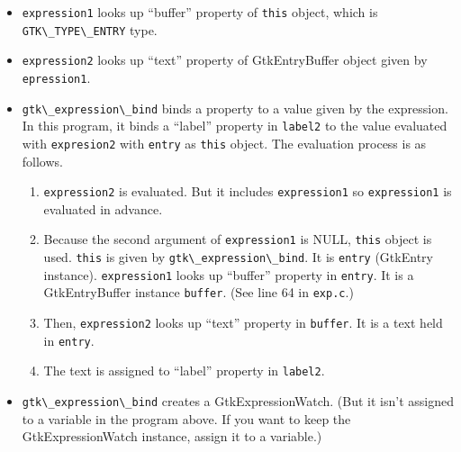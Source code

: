 \begin{itemize}
\tightlist
\item
  \passthrough{\lstinline!expression1!} looks up ``buffer'' property of
  \passthrough{\lstinline!this!} object, which is
  \passthrough{\lstinline!GTK\_TYPE\_ENTRY!} type.
\item
  \passthrough{\lstinline!expression2!} looks up ``text'' property of
  GtkEntryBuffer object given by \passthrough{\lstinline!epression1!}.
\item
  \passthrough{\lstinline!gtk\_expression\_bind!} binds a property to a
  value given by the expression. In this program, it binds a ``label''
  property in \passthrough{\lstinline!label2!} to the value evaluated
  with \passthrough{\lstinline!expresion2!} with
  \passthrough{\lstinline!entry!} as \passthrough{\lstinline!this!}
  object. The evaluation process is as follows.

  \begin{enumerate}
  \def\labelenumi{\arabic{enumi}.}
  \tightlist
  \item
    \passthrough{\lstinline!expression2!} is evaluated. But it includes
    \passthrough{\lstinline!expression1!} so
    \passthrough{\lstinline!expression1!} is evaluated in advance.
  \item
    Because the second argument of \passthrough{\lstinline!expression1!}
    is NULL, \passthrough{\lstinline!this!} object is used.
    \passthrough{\lstinline!this!} is given by
    \passthrough{\lstinline!gtk\_expression\_bind!}. It is
    \passthrough{\lstinline!entry!} (GtkEntry instance).
    \passthrough{\lstinline!expression1!} looks up ``buffer'' property
    in \passthrough{\lstinline!entry!}. It is a GtkEntryBuffer instance
    \passthrough{\lstinline!buffer!}. (See line 64 in
    \passthrough{\lstinline!exp.c!}.)
  \item
    Then, \passthrough{\lstinline!expression2!} looks up ``text''
    property in \passthrough{\lstinline!buffer!}. It is a text held in
    \passthrough{\lstinline!entry!}.
  \item
    The text is assigned to ``label'' property in
    \passthrough{\lstinline!label2!}.
  \end{enumerate}
\item
  \passthrough{\lstinline!gtk\_expression\_bind!} creates a
  GtkExpressionWatch. (But it isn't assigned to a variable in the
  program above. If you want to keep the GtkExpressionWatch instance,
  assign it to a variable.)
\end{itemize}


